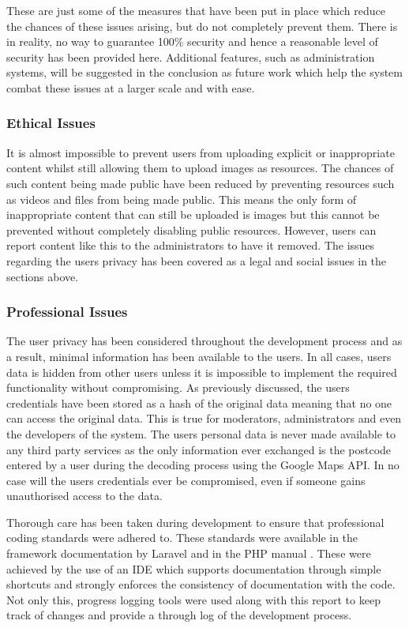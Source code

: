 These are just some of the measures that have been put in place which reduce the chances of these issues arising, but do not completely prevent them. There is in reality, no way to guarantee 100\% security and hence a reasonable level of security has been provided here. Additional features, such as administration systems, will be suggested in the conclusion as future work which help the system combat these issues at a larger scale and with ease.

\subsubsection{Ethical Issues}
It is almost impossible to prevent users from uploading explicit or inappropriate content whilst still allowing them to upload images as resources. The chances of such content being made public have been reduced by preventing resources such as videos and files from being made public. This means the only form of inappropriate content that can still be uploaded is images but this cannot be prevented without completely disabling public resources. However, users can report content like this to the administrators to have it removed. The issues regarding the users privacy has been covered as a legal and social issues in the sections above.

\subsubsection{Professional Issues}
The user privacy has been considered throughout the development process and as a result, minimal information has been available to the users. In all cases, users data is hidden from other users unless it is impossible to implement the required functionality without compromising. As previously discussed, the users credentials have been stored as a hash of the original data meaning that no one can access the original data. This is true for moderators, administrators and even the developers of the system. The users personal data is never made available to any third party services as the only information ever exchanged is the postcode entered by a user during the decoding process using the Google Maps API. In no case will the users credentials ever be compromised, even if someone gains unauthorised access to the data.

Thorough care has been taken during development to ensure that professional coding standards were adhered to. These standards were available in the framework documentation by Laravel and in the PHP manual \cite{Laravel:Home, PHP:Home}. These were achieved by the use of an IDE which supports documentation through simple shortcuts and strongly enforces the consistency of documentation with the code. Not only this, progress logging tools were used along with this report to keep track of changes and provide a through log of the development process.


